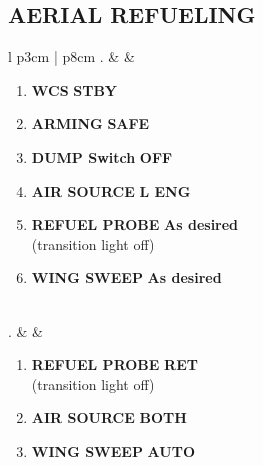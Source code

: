 \documentclass[fontHelvetica]{TechCheck}
\begin{document}
	\subsection{AERIAL REFUELING}
	\begin{center}
		\begin{longtable}{l p{3cm} | p{8cm}}
			. &  &
			\begin{minipage}[t]{\linewidth}
				\vspace{-7pt}
				\begin{enumerate}
					\item \textbf{WCS} \dotfill \textbf{STBY}
					\item \textbf{ARMING} \dotfill \textbf{SAFE}
					\item \textbf{DUMP Switch} \dotfill \textbf{OFF}
					\item \textbf{AIR SOURCE} \dotfill \textbf{L ENG}
					\item \textbf{REFUEL PROBE} \dotfill \textbf{As desired} \\
					\hfill (transition light off)
					\item \textbf{WING SWEEP} \dotfill \textbf{As desired}
				\end{enumerate}
			\end{minipage} \\
			. &  &
			\begin{minipage}[t]{\linewidth}
				\vspace{-7pt}
				\begin{enumerate}
					\item \textbf{REFUEL PROBE} \dotfill \textbf{RET} \\
					\hfill (transition light off)
					\item \textbf{AIR SOURCE} \dotfill \textbf{BOTH}
					\item \textbf{WING SWEEP} \dotfill \textbf{AUTO}
				\end{enumerate}
			\end{minipage} \\
			\bottomrule
		\end{longtable}
	\end{center}

	\clearpage
\end{document}
